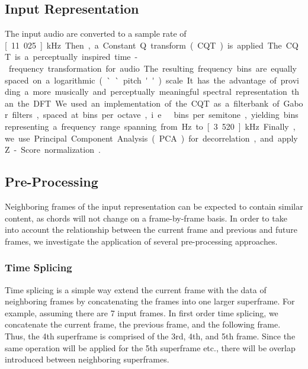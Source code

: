 \documentclass{article}
\begin{document}
\subsection{Input Representation}\label{sec:input}
The input audio are converted to a sample rate of \unit[11.025]{kHz}. Then, a Constant Q transform (CQT) is applied. 
The CQT is a perceptually inspired time-frequency transformation for audio. The resulting frequency bins are equally spaced on a logarithmic (``pitch'') scale. It has the advantage of providing a more musically and perceptually meaningful spectral representation than the DFT. 
We used an implementation of the CQT as a filterbank of Gabor filters, spaced at \unit[36]{bins per octave}, i.e.\ \unit[3]{bins per semitone}, yielding \unit[180]{bins} representing a frequency range spanning from \unit[110]{Hz} to \unit[3.520]{kHz}. Finally, we use Principal Component Analysis (PCA) for decorrelation, and apply Z-Score normalization\cite{sola1997importance}. 

\subsection{Pre-Processing}\label{sec:pre-proc}
Neighboring frames of the input representation can be expected to contain similar content, as chords will not change on a frame-by-frame basis. In order to take into account the relationship between the current frame and previous and future frames, we investigate the application of several pre-processing approaches.

\subsubsection{Time Splicing}
Time splicing is a simple way extend the current frame with the data of neighboring frames by concatenating the frames into one larger superframe. For example, assuming there are 7 input frames. In first order time splicing, we concatenate the current frame, the previous frame, and the following frame. Thus, the 4th superframe is comprised of the 3rd, 4th, and 5th frame. Since the same operation will be applied for the 5th superframe etc., there will be overlap introduced between neighboring superframes. %
\end{document}

